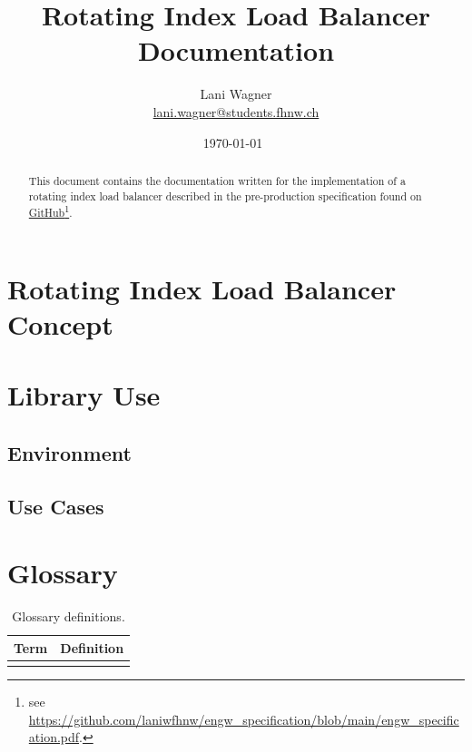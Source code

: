 \documentclass[11pt]{article} %
\title{Rotating Index Load Balancer Documentation}
\author{Lani Wagner\\\href{mailto:lani.wagner@students.fhnw.ch}{lani.wagner@students.fhnw.ch}}
\date{\today\ \currenttime} %
\begin{document}
    \VerbatimFootnotes
    \clearpage\maketitle
    \thispagestyle{empty}
    \begin{abstract}
        This document contains the documentation written for the implementation of a rotating index load balancer described in the pre-production specification found on \href{https://github.com/laniwfhnw/engw_specification/blob/main/engw_specification.pdf}{GitHub}\footnote{see \url{https://github.com/laniwfhnw/engw_specification/blob/main/engw_specification.pdf}.}.
    \end{abstract}
    {\hypersetup{hidelinks} \tableofcontents}
    \newpage



    \section{Rotating Index Load Balancer Concept}


    \section{Library Use}


    \subsection{Environment}


    \subsection{Use Cases}




    \newpage



    \section{Glossary}

    \begin{table}[H]
        \centering
        \begin{tabular}{p{.3\linewidth} | p{.6\linewidth}}
            \textbf{Term} & \textbf{Definition}
            \\\hline
            &
        \end{tabular}
        \caption{Glossary definitions.}
        \label{tab:glossary}
    \end{table}
    \printbibliography[heading=bibintoc]
    \listoffigures
    \listoftables
\end{document}
